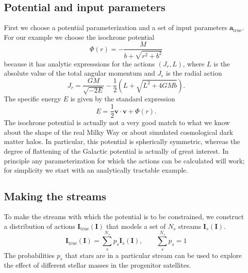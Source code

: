 \documentclass{emulateapj}
\newcommand{\sub}[2]{\ensuremath{#1_{\mathrm{#2}}}}
\newcommand{\half}{\frac{1}{2}}
\begin{document}
\subsection{Potential and input parameters}
First we choose a potential parameterization and a set of input parameters $\sub{\mathbf{a}}{true}$. For our example we choose the isochrone potential
\begin{equation}
 \Phi(r) = -\frac{M}{b+\sqrt{r^2+b^2}}
\end{equation} 
 because it has analytic expresssions for the actions $(J_r,L)$, where $L$ is the absolute value of the total angular momentum and $J_r$ is the radial action
\begin{equation}
 J_r = \frac{G M}{\sqrt{-2E}} - \half \left(L+\sqrt{L^2 + 4 G M b}\right).
\end{equation}
The specific energy $E$ is given by the standard expression
\begin{equation}
 E = \half \mathbf{v}\cdot\mathbf{v} + \Phi(r).
\end{equation} 
The isochrone potential is actually not a very good match to what we know about the shape of the real Milky Way or about simulated cosmological dark matter halos. In particular, this potential is spherically symmetric, whereas the degree of flattening of the Galactic potential is actually of great interest. In principle any parameterization for which the actions can be calculated will work; for simplicity we start with an analytically tractable example.

\subsection{Making the streams}
To make the streams with which the potential is to be constrained, we construct a distribution of actions $\sub{\mathbf{I}}{true}(\mathbf{I})$ that models a set of $N_s$ streams $\mathbf{I}_s(\mathbf{I})$.
\begin{equation}
 \sub{\mathbf{I}}{true}(\mathbf{I}) = \sum_s^{N_s} p_s \mathbf{I}_s(\mathbf{I}), \qquad \sum_s^{N_s} p_s = 1
\end{equation} 
The probabilities $p_s$ that stars are in a particular stream can be used to explore the effect of different stellar masses in the progenitor satellites. 
\end{document}
